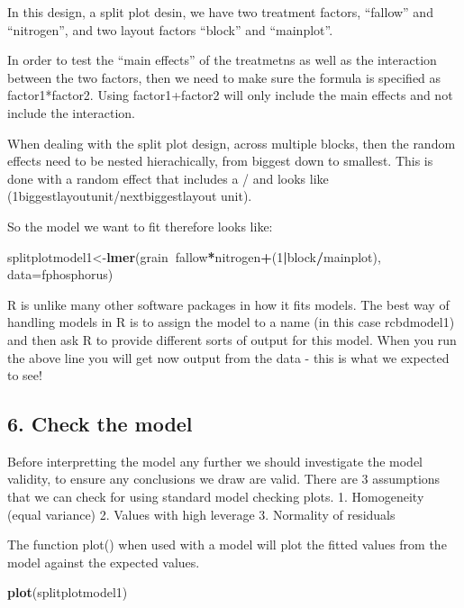 \documentclass[]{book}
\newenvironment{Shaded}{\begin{snugshade}}{\end{snugshade}}
\newcommand{\KeywordTok}[1]{\textcolor[rgb]{0.13,0.29,0.53}{\textbf{#1}}}
\newcommand{\DataTypeTok}[1]{\textcolor[rgb]{0.13,0.29,0.53}{#1}}
\newcommand{\DecValTok}[1]{\textcolor[rgb]{0.00,0.00,0.81}{#1}}
\newcommand{\OperatorTok}[1]{\textcolor[rgb]{0.81,0.36,0.00}{\textbf{#1}}}
\newcommand{\NormalTok}[1]{#1}
\theoremstyle{definition}
\theoremstyle{definition}
\theoremstyle{definition}
\theoremstyle{remark}
\begin{document}
In this design, a split plot desin, we have two treatment factors,
``fallow'' and ``nitrogen'', and two layout factors ``block'' and
``mainplot''.

In order to test the ``main effects'' of the treatmetns as well as the
interaction between the two factors, then we need to make sure the
formula is specified as factor1*factor2. Using factor1+factor2 will only
include the main effects and not include the interaction.

When dealing with the split plot design, across multiple blocks, then
the random effects need to be nested hierachically, from biggest down to
smallest. This is done with a random effect that includes a / and looks
like (1\textbar{}biggestlayoutunit/nextbiggestlayout unit).

So the model we want to fit therefore looks like:

\begin{Shaded}
\begin{Highlighting}[]
\NormalTok{splitplotmodel1<-}\KeywordTok{lmer}\NormalTok{(grain}\OperatorTok{~}\NormalTok{fallow}\OperatorTok{*}\NormalTok{nitrogen}\OperatorTok{+}\NormalTok{(}\DecValTok{1}\OperatorTok{|}\NormalTok{block}\OperatorTok{/}\NormalTok{mainplot), }\DataTypeTok{data=}\NormalTok{fphosphorus)}
\end{Highlighting}
\end{Shaded}

R is unlike many other software packages in how it fits models. The best
way of handling models in R is to assign the model to a name (in this
case rcbdmodel1) and then ask R to provide different sorts of output for
this model. When you run the above line you will get now output from the
data - this is what we expected to see!

\subsection{6. Check the model}\label{check-the-model-1}

Before interpretting the model any further we should investigate the
model validity, to ensure any conclusions we draw are valid. There are 3
assumptions that we can check for using standard model checking plots.
1. Homogeneity (equal variance) 2. Values with high leverage 3.
Normality of residuals

The function plot() when used with a model will plot the fitted values
from the model against the expected values.

\begin{Shaded}
\begin{Highlighting}[]
\KeywordTok{plot}\NormalTok{(splitplotmodel1)}
\end{Highlighting}
\end{Shaded}
\end{document}
